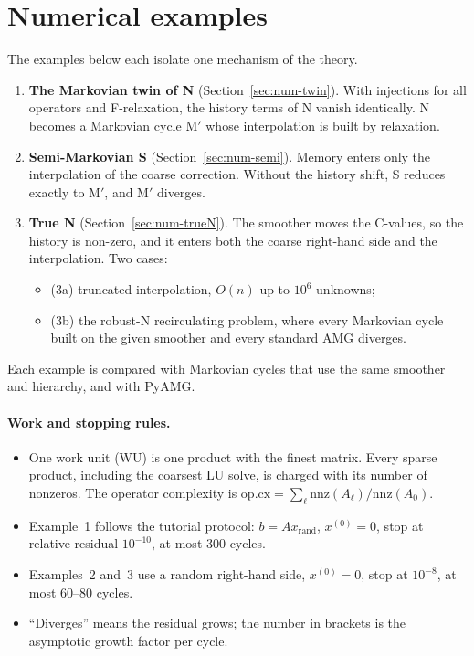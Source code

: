 \providecommand{\Ps}{P^{\sharp}}
\providecommand{\Qs}{Q^{\sharp}}
\providecommand{\Rh}{\widehat R}
\providecommand{\Pt}{\tilde P}
\providecommand{\St}{\tilde S}
\providecommand{\WU}{\ensuremath{\mathrm{WU}}}
\providecommand{\opcx}{\ensuremath{\mathrm{op.cx}}}

\section{Numerical examples}\label{sec:numerics}

The examples below each isolate one mechanism of the theory.
\begin{enumerate}
  \item \textbf{The Markovian twin of N} (Section~\ref{sec:num-twin}). With injections for all operators and
    F-relaxation, the history terms of N vanish identically. N becomes a Markovian cycle M$'$ whose interpolation
    is built by relaxation.
  \item \textbf{Semi-Markovian S} (Section~\ref{sec:num-semi}). Memory enters only the interpolation of the coarse
    correction. Without the history shift, S reduces exactly to M$'$, and M$'$ diverges.
  \item \textbf{True N} (Section~\ref{sec:num-trueN}). The smoother moves the C-values, so the history is non-zero,
    and it enters both the coarse right-hand side and the interpolation. Two cases:
    \begin{itemize}
      \item (3a) truncated interpolation, $O(n)$ up to $10^6$ unknowns;
      \item (3b) the robust-N recirculating problem, where every Markovian cycle built on the given smoother and
        every standard AMG diverges.
    \end{itemize}
\end{enumerate}
Each example is compared with Markovian cycles that use the same smoother and hierarchy, and with PyAMG.

\paragraph{Work and stopping rules.}
\begin{itemize}
  \item One work unit (WU) is one product with the finest matrix. Every sparse product, including the coarsest LU
    solve, is charged with its number of nonzeros. The operator complexity is
    $\opcx=\sum_\ell \mathrm{nnz}(A_\ell)/\mathrm{nnz}(A_0)$.
  \item Example~1 follows the tutorial protocol: $b=Ax_{\mathrm{rand}}$, $x^{(0)}=0$, stop at relative residual
    $10^{-10}$, at most 300 cycles.
  \item Examples~2 and~3 use a random right-hand side, $x^{(0)}=0$, stop at $10^{-8}$, at most 60--80 cycles.
  \item ``Diverges'' means the residual grows; the number in brackets is the asymptotic growth factor per cycle.
\end{itemize}

